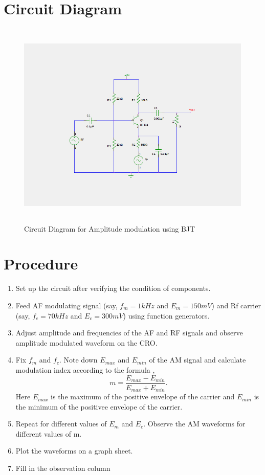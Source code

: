 \documentclass{book}
\begin{document}
\section*{Circuit Diagram}
\begin{figure}[h]
\includegraphics[width=15cm, height=10cm, trim=5cm 3.5cm 4cm 3.5cm, clip=true]{AM.png}
\caption{Circuit Diagram for Amplitude modulation using BJT}

\end{figure}

\section*{Procedure}
\begin{enumerate}
\item
Set up the circuit after verifying the condition of components.
\item
Feed AF modulating signal (say, $f_m=1kHz$ and $E_m=150mV$) and Rf carrier (say, $f_c=70kHz$ and $E_c=300mV$) using function generators.
\item
Adjust amplitude and frequencies of the AF and RF signals and observe amplitude modulated waveform on the CRO.
\item
Fix $f_m$ and $f_c$. Note down $E_{max}$ and $E_{min}$ of the AM signal and calculate modulation index according to the formula ,
\begin{equation}
m=\frac{E_{max}-E_{min}}{E_{max}+E_{min}}.
\end{equation}
Here $E_{max}$ is the maximum of the positive envelope of the carrier and $E_{min}$ is the minimum of the positivee envelope of the carrier.
\item
Repeat for different values of $E_m$ and $E_c$. Observe the AM waveforms for different values of m.
\item
Plot the waveforms on a graph sheet.
\item

Fill in the observation column
\end{enumerate}
\end{document}
